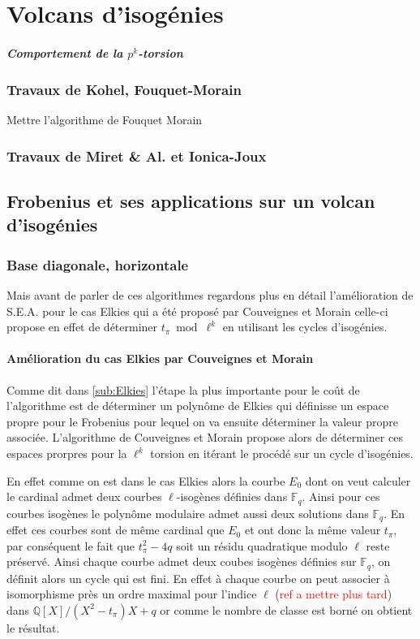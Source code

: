 \documentclass[10pt,a4paper]{book}
\theoremstyle{plain}
\theoremstyle{definition}
\theoremstyle{definition}
\theoremstyle{definition}
\theoremstyle{definition}
\theoremstyle{remark}
\theoremstyle{remark}
\begin{document}
\chapter{Volcans d'isogénies}
\paragraph{Comportement de la $p^k$-torsion}

\subsection{Travaux de Kohel, Fouquet-Morain}
Mettre l'algorithme de Fouquet Morain
\subsection{Travaux de Miret \& Al. et Ionica-Joux}


\section{Frobenius et ses applications sur un volcan d'isogénies}
\subsection{Base diagonale, horizontale}
Mais avant de parler de ces algorithmes regardons plus en détail l'amélioration de S.E.A. pour le cas Elkies qui a été proposé par Couveignes et Morain \cite{Couveignes96isogenycycles} celle-ci propose en effet de déterminer $t_{\pi} \bmod \ell^k$ en utilisant les cycles d'isogénies. 

\subsubsection{Amélioration du cas Elkies par Couveignes et Morain}
Comme dit dans \ref{sub:Elkies} l'étape la plus importante pour le coût de l'algorithme est de déterminer un polynôme de Elkies qui définisse un espace propre pour le Frobenius pour lequel on va ensuite déterminer la valeur propre associée. L'algorithme de Couveignes et Morain propose alors de déterminer ces espaces prorpres pour la $\ell^k$ torsion en itérant le procédé sur un cycle d'isogénies.

En effet comme on est dans le cas Elkies alors la courbe $E_0$ dont on veut calculer le cardinal admet deux  courbes $\ell$-isogènes définies dans $\mathbb{F}_q$. Ainsi pour ces courbes isogènes le polynôme modulaire admet aussi deux solutions  dans $\mathbb{F}_q$. En effet ces courbes sont de même cardinal que $E_0$ et ont donc la même valeur $t_{\pi}$, par conséquent le fait que $t_{\pi}^2-4q$ soit un résidu quadratique modulo $\ell$ reste préservé. Ainsi chaque courbe admet deux coubes isogènes définies sur $\mathbb{F}_q$, on définit alors un cycle qui est fini. En effet à chaque courbe on peut associer à isomorphisme près un ordre maximal pour l'indice $\ell$ (\textcolor{red}{ref a mettre plus tard}) dans $\mathbb{Q}[X]/(X^2-t_{\pi})X+q$ or comme le nombre de classe est borné on obtient le résultat. 
\end{document}
